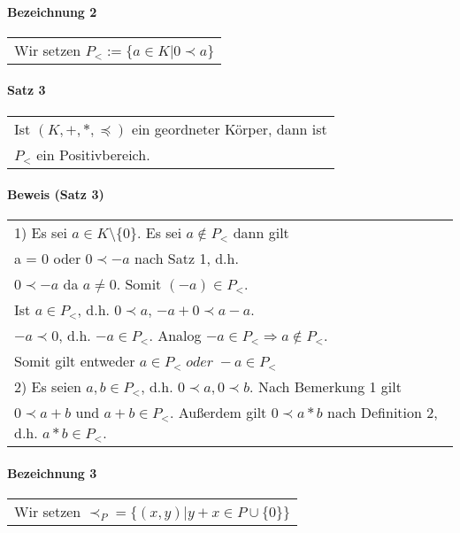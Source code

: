 \documentclass[a4paper]{scrartcl}
\begin{document}
\paragraph{Bezeichnung 2}
\begin{tabbing}
\begin{tabular}{l}
Wir setzen $P_< := \{ a\in K| 0 \prec a\}$ 
\end{tabular}
\end{tabbing}

\paragraph{Satz 3}
\begin{tabbing}
\begin{tabular}{l}
Ist $(K,+,*,\preceq)$ ein geordneter Körper, dann ist \\
$P_<$ ein Positivbereich.
\end{tabular}
\end{tabbing}

\paragraph{Beweis (Satz 3)}
\begin{tabbing}
\begin{tabular}{l}
1) Es sei $a\in K\setminus \{ 0\}$. Es sei $a \notin P_<$ dann gilt\\
a = 0 oder $0 \prec -a$ nach Satz 1, d.h.\\
$0 \prec -a$ da $a \neq 0$. Somit $(-a) \in P_<$.\\
Ist $a\in P_<$, d.h. $0\prec a$, $-a+0 \prec a-a$.\\
$-a \prec 0$, d.h. $-a\in P_<$. Analog $-a\in P_< \Rightarrow a \notin P_<$.\\
Somit gilt entweder $a\in P_< \; oder \; -a\in P_<$\\
2) Es seien $a,b\in P_<$, d.h. $0 \prec a, 0\prec b$. Nach Bemerkung 1 gilt\\
$0 \prec a+b$ und $a+b\in P_<$. Außerdem gilt $0\prec a*b$ nach Definition 2, d.h. $a*b\in P_<.$
\end{tabular}
\end{tabbing}

\paragraph{Bezeichnung 3}
\begin{tabbing}
\begin{tabular}{l}
Wir setzen $\prec_P = \{ (x,y)| y+x\in P\cup\{ 0\} \}$
\end{tabular}
\end{tabbing}
\end{document}
